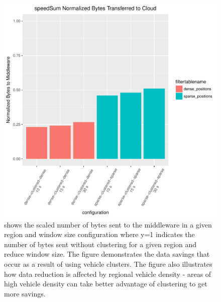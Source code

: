 \documentclass{thesis}
\begin{document}
    \begin{figure}
        \centering
        \includegraphics[scale=.8]{binImages/speedSum-runplot-normalized.pdf}
        \caption{shows the scaled number of bytes sent to the middleware in a given region and window size
        configuration where y=1 indicates the number of bytes sent without clustering for a given region
        and reduce window size. The figure demonstrates the data savings that occur as a result of using
        vehicle clusters. The figure also illustrates how data reduction is affected by regional vehicle
        density - areas of high vehicle density can take better advantage of clustering to get more savings.}
    \end{figure}
\end{document}
